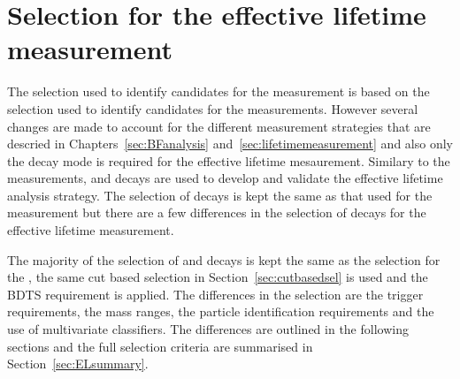 \section{Selection for the effective lifetime measurement}
\label{sec:ELsel}
The selection used to identify candidates for the \el measurement is based on the selection used to identify candidates for the \BF measurements. However several changes are made to account for the different measurement strategies that are descried in Chapters~\ref{sec:BFanalysis} and~\ref{sec:lifetimemeasurement} and also only the \bs decay mode is required for the effective lifetime mesaurement. 
Similary to the \BF measurements, \bhh and \bsjpsiphi decays are used to develop and validate the effective lifetime analysis strategy. The selection of \bsjpsiphi decays is kept the same as that used for the \BF measurement but there are a few differences in the selection of \bhh decays for the effective lifetime measurement.

The majority of the selection of \bsmumu and \bhh decays is kept the same as the selection for the \BFm, the same cut based selection in Section~\ref{sec:cutbasedsel} is used and the BDTS requirement is applied.   
The differences in the selection are the trigger requirements, the mass ranges, the particle identification requirements and the use of multivariate classifiers. The differences are outlined in the following sections and the full selection criteria are summarised in Section~\ref{sec:ELsummary}.


